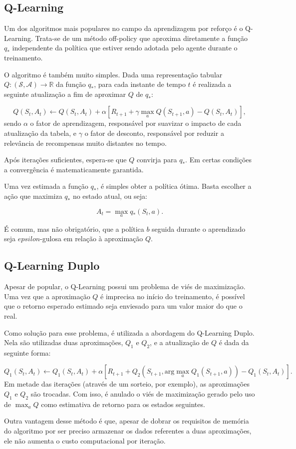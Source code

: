 \subsection{Q-Learning}
\label{subsec:q-theory}
Um dos algoritmos mais populares no campo da aprendizagem por reforço é o Q-Learning. Trata-se de um método off-policy que aproxima diretamente a função $q_*$ independente da política que estiver sendo adotada pelo agente durante o treinamento.

O algoritmo é também muito simples. Dada uma representação tabular $Q: (\mathcal{S},\mathcal{A}) \to \mathbb{R}$ da função $q_*$, para cada instante de tempo $t$ é realizada a seguinte atualização a fim de aproximar $Q$ de $q_*$:

\begin{equation}
Q(S_t, A_t) \leftarrow Q(S_t, A_t) + \alpha[R_{t+1} + \gamma\max_{a} Q(S_{t+1}, a) - Q(S_t, A_t)],
\end{equation}
% 
sendo $\alpha$ o fator de aprendizagem, responsável por suavizar o impacto de cada atualização da tabela, e $\gamma$ o fator de desconto, responsável por reduzir a relevância de recompensas muito distantes no tempo.

Após iterações suficientes, espera-se que $Q$ convirja para $q_*$. Em certas condições a convergência é matematicamente garantida.

Uma vez estimada a função $q_*$, é simples obter a política ótima. Basta escolher a ação que maximiza $q_*$ no estado atual, ou seja:

\begin{equation}
A_{t} = \max_{a} q_*(S_t, a).
\end{equation}

É comum, mas não obrigatório, que a política $b$ seguida durante o aprendizado seja $epsilon$-gulosa em relação à aproximação $Q$.

\subsection{Q-Learning Duplo}
\label{subsec:dq-theory}
Apesar de popular, o Q-Learning possui um problema de viés de maximização. Uma vez que a aproximação $Q$ é imprecisa no início do treinamento, é possível que o retorno esperado estimado seja enviesado para um valor maior do que o real.

Como solução para esse problema, é utilizada a abordagem do Q-Learning Duplo. Nela são utilizadas duas aproximações, $Q_1$ e $Q_2$, e a atualização de $Q$ é dada da seguinte forma:

\begin{equation}
\label{eq:doubleq}
Q_1(S_t, A_t) \leftarrow Q_1(S_t, A_t) + \alpha[R_{t+1} + Q_2(S_{t+1}, \text{arg}\max_a Q_1(S_{t+1}, a)) - Q_1(S_t, A_t)].
\end{equation}
% 
Em metade das iterações (através de um sorteio, por exemplo), as aproximações $Q_1$ e $Q_2$ são trocadas. Com isso, é anulado o viés de maximização gerado pelo uso de $\max_a Q$ como estimativa de retorno para os estados seguintes.

Outra vantagem desse método é que, apesar de dobrar os requisitos de memória do algoritmo por ser preciso armazenar os dados referentes a duas aproximações, ele não aumenta o custo computacional por iteração.
